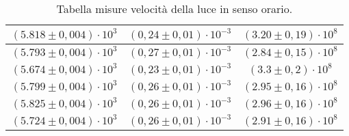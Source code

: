 \begin{table}[H]
\begin{tabular}{|c|c|c|}
        \hline
        $ (5.818 \pm 0,004) \cdot 10^{3} $ & $ (0,24 \pm 0,01) \cdot 10^{-3} $ & $ (3.20 \pm 0,19) \cdot 10^{8} $\\
        \hline
        $ (5.793 \pm 0,004) \cdot 10^{3} $ & $ (0,27 \pm 0,01) \cdot 10^{-3} $ & $ (2.84 \pm 0,15) \cdot 10^{8} $\\
        \hline
        $ (5.674 \pm 0,004) \cdot 10^{3} $ & $ (0,23 \pm 0,01) \cdot 10^{-3} $ & $ (3.3 \pm 0,2) \cdot 10^{8} $\\
        \hline
        $ (5.799 \pm 0,004) \cdot 10^{3} $ & $ (0,26 \pm 0,01) \cdot 10^{-3} $ & $ (2.95 \pm 0,16) \cdot 10^{8} $\\
        \hline
        $ (5.825 \pm 0,004) \cdot 10^{3} $ & $ (0,26 \pm 0,01) \cdot 10^{-3} $ & $ (2.96 \pm 0,16) \cdot 10^{8} $\\
        \hline
        $ (5.724 \pm 0,004) \cdot 10^{3} $ & $ (0,26 \pm 0,01) \cdot 10^{-3} $ & $ (2.91 \pm 0,16) \cdot 10^{8} $\\
        \hline
        \end{tabular}
    \caption{Tabella misure velocità della luce in senso orario.}
\end{table}